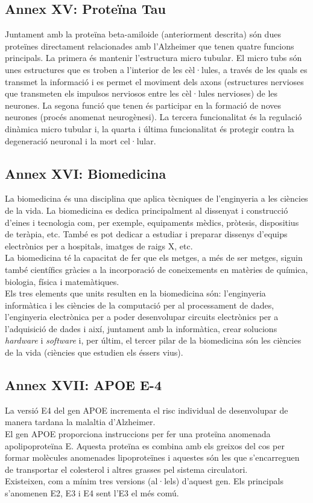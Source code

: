 \documentclass[a4paper,12pt]{article}
\begin{document}
\subsection*{Annex XV: Proteïna Tau}
Juntament amb la proteïna beta-amiloide (anteriorment descrita) són dues proteïnes directament relacionades amb l'Alzheimer que tenen quatre funcions principals. La primera és mantenir l'estructura micro tubular. El micro tubs són unes estructures que es troben a l'interior de les cèl·lules, a través de les quals es transmet la informació i es permet el moviment dels axons (estructures nervioses que transmeten els impulsos nerviosos entre les cèl·lules nervioses) de les neurones. La segona funció que tenen és participar en la formació de noves neurones (procés anomenat neurogènesi). La tercera funcionalitat és la regulació dinàmica micro tubular i, la quarta i última funcionalitat és protegir contra la degeneració neuronal i la mort cel·lular.
\subsection*{Annex XVI: Biomedicina}
La biomedicina és una disciplina que aplica tècniques de l'enginyeria a les ciències de la vida. La biomedicina es dedica principalment al dissenyat i construcció d'eines i tecnologia com, per exemple, equipaments mèdics, pròtesis, dispositius de teràpia, etc. També es pot dedicar a estudiar i preparar dissenys d'equips electrònics per a hospitals, imatges de raigs X, etc.\\
La biomedicina té la capacitat de fer que els metges, a més de ser metges, siguin també científics gràcies a la incorporació de coneixements en matèries de química, biologia, física i matemàtiques.\\
Els tres elements que units resulten en la biomedicina són: l'enginyeria informàtica i les ciències de la computació per al processament de dades, l'enginyeria electrònica per a poder desenvolupar circuits electrònics per a l'adquisició de dades i així, juntament amb la informàtica, crear solucions \textit{hardware} i \textit{software} i, per últim, el tercer pilar de la biomedicina són les ciències de la vida (ciències que estudien els éssers vius).
\subsection*{Annex XVII: APOE E-4}
La versió E4 del gen APOE incrementa el risc individual de desenvolupar de manera tardana la malaltia d'Alzheimer.\\
El gen APOE proporciona instruccions per fer una proteïna anomenada apolipoproteïna E. Aquesta proteïna es combina amb els greixos del cos per formar molècules anomenades lipoproteïnes i aquestes són les que s'encarreguen de transportar el colesterol i altres grasses pel sistema circulatori.\\
Existeixen, com a mínim tres versions (al·lels) d'aquest gen. Els principals s'anomenen E2, E3 i E4 sent l'E3 el més comú.
\end{document}
